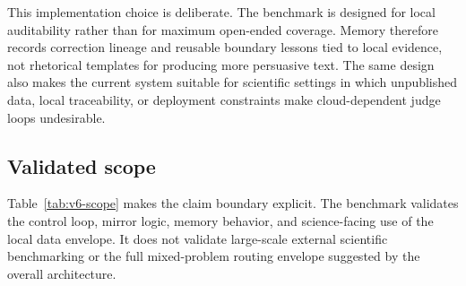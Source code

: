 \documentclass[12pt]{article}
\begin{document}
This implementation choice is deliberate. The benchmark is designed for local auditability rather than for maximum open-ended coverage. Memory therefore records correction lineage and reusable boundary lessons tied to local evidence, not rhetorical templates for producing more persuasive text. The same design also makes the current system suitable for scientific settings in which unpublished data, local traceability, or deployment constraints make cloud-dependent judge loops undesirable.

\subsection{Validated scope}

\begin{table}[H]
\centering
{}
\caption{Implemented, exercised, and deferred scope. The table separates the full system envelope from the subset actually validated by the present benchmark.}
\label{tab:v6-scope}
\end{table}

Table~\ref{tab:v6-scope} makes the claim boundary explicit. The benchmark validates the control loop, mirror logic, memory behavior, and science-facing use of the local data envelope. It does not validate large-scale external scientific benchmarking or the full mixed-problem routing envelope suggested by the overall architecture.
\end{document}
